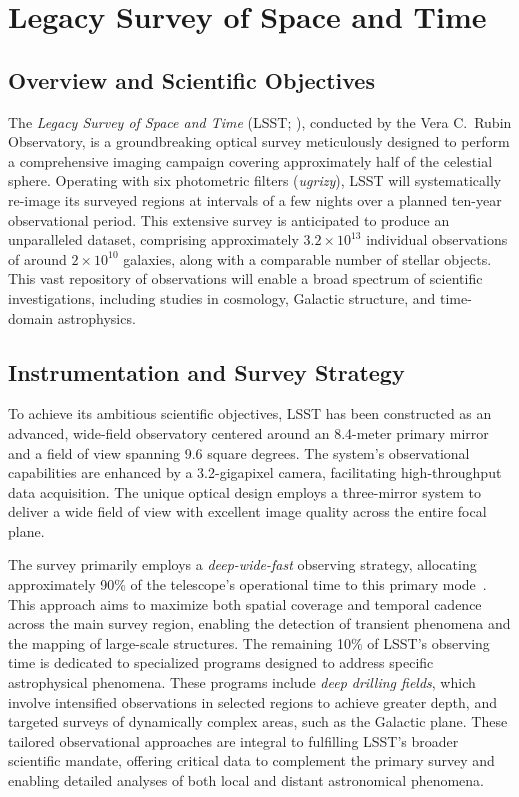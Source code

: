 \section{Legacy Survey of Space and Time}

\subsection{Overview and Scientific Objectives}

The \emph{Legacy Survey of Space and Time} (LSST; \citealt{2009arXiv0912.0201L, 2019ApJ...873..111I}), conducted by the Vera C.\ Rubin Observatory, is a groundbreaking optical survey meticulously designed to perform a comprehensive imaging campaign covering approximately half of the celestial sphere. Operating with six photometric filters (\emph{ugrizy}), LSST will systematically re-image its surveyed regions at intervals of a few nights over a planned ten-year observational period. This extensive survey is anticipated to produce an unparalleled dataset, comprising approximately $3.2 \times 10^{13}$ individual observations of around $2 \times 10^{10}$ galaxies, along with a comparable number of stellar objects. This vast repository of observations will enable a broad spectrum of scientific investigations, including studies in cosmology, Galactic structure, and time-domain astrophysics.

\subsection{Instrumentation and Survey Strategy}

To achieve its ambitious scientific objectives, LSST has been constructed as an advanced, wide-field observatory centered around an 8.4-meter primary mirror and a field of view spanning 9.6 square degrees. The system's observational capabilities are enhanced by a 3.2-gigapixel camera, facilitating high-throughput data acquisition. The unique optical design employs a three-mirror system to deliver a wide field of view with excellent image quality across the entire focal plane.

The survey primarily employs a \emph{deep-wide-fast} observing strategy, allocating approximately 90\% of the telescope's operational time to this primary mode~\cite{2009arXiv0912.0201L}. This approach aims to maximize both spatial coverage and temporal cadence across the main survey region, enabling the detection of transient phenomena and the mapping of large-scale structures. The remaining 10\% of LSST's observing time is dedicated to specialized programs designed to address specific astrophysical phenomena. These programs include \emph{deep drilling fields}, which involve intensified observations in selected regions to achieve greater depth, and targeted surveys of dynamically complex areas, such as the Galactic plane. These tailored observational approaches are integral to fulfilling LSST's broader scientific mandate, offering critical data to complement the primary survey and enabling detailed analyses of both local and distant astronomical phenomena.

